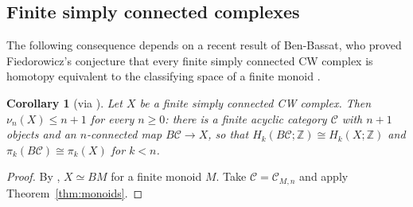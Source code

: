 \documentclass[12pt]{amsart}
\newtheorem{corollary}[teo]{Corollary}
\theoremstyle{definition}
\theoremstyle{remark}
\newcommand{\CC}{\mathcal{C}}
\newcommand{\Z}{\mathbb{Z}}
\begin{document}
\subsection{Finite simply connected complexes}\label{subsec:approx}

The following consequence depends on a recent result of Ben-Bassat, who proved Fiedorowicz's conjecture that every finite simply connected CW complex is homotopy equivalent to the classifying space of a finite monoid \cite[Theorem~C]{BenBassat2026}.

\begin{corollary}[{via \cite[Theorem~C]{BenBassat2026}}]\label{cor:approx}
Let $X$ be a finite simply connected CW complex. Then $\nu_n(X)\le n+1$ for every $n\ge0$: there is a finite acyclic category $\CC$ with $n+1$ objects and an $n$-connected map $B\CC\to X$, so that $H_k(B\CC;\Z)\cong H_k(X;\Z)$ and $\pi_k(B\CC)\cong\pi_k(X)$ for $k<n$.
\end{corollary}

\begin{proof}
By \cite[Theorem~C]{BenBassat2026}, $X\simeq BM$ for a finite monoid $M$. Take $\CC=\CC_{M,n}$ and apply Theorem~\ref{thm:monoids}.
\end{proof}
\end{document}
